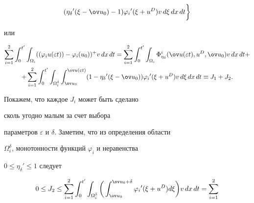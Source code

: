 \begin{pf}
\begin{multline*}
{({\eta_{\delta}}' (\xi-\ov u_{0})-1)


{\varphi_{i}}' (\xi+u^{D}) v\, d \xi\, d x\, d t} \bigg\}


\end{multline*}


или 


\begin{multline*} 


\sum_{i=1}^{2} 


\int_{0}^{{t}'} \int_{\Omega_{i}} (({\varphi_{i} u(\varepsilon t))-


\varphi_{i} (u_{0})} )^{+} v\, d x\, d t=


\sum_{i=1}^{2} \int_{0}^{{t}'} 


\int_{\Omega_{i}} \Phi_{\eta_{\delta}}^{i}


(\ov u (\varepsilon t), u^{D}, \ov u_{0}) v\, d x\, d t+\\


%


+\sum_{i=1}^{2} 


\int_{0}^{{t}'} \int_{\Omega_{i}^{\delta}}


\int_{\ov u_{0}}^{\ov u(\varepsilon t)} 


({1 -{\eta_{\delta}}' (\xi-\ov u_{0})} ) 


{\varphi_{i}}' (\xi+u^{D}) v\, d \xi\, d x\, dt \equiv J_{1}+J_{2}.


\end{multline*}





Покажем, что каждое $J_{i}$ может быть сделано 


сколь угодно малым за счет выбора


параметров $\varepsilon$ и $\delta$. Заметим, что из определения области


$\Omega_{i}^{\delta}$, монотонности функций $\varphi_{i}$ и неравенства


$0 \leq{\eta_{\delta}}' \leq 1$ следует


\begin{multline*}


0 \leq J_{2} \leq \sum_{i=1}^{2} 


\int_{0}^{{t}'} \int_{\Omega_{i}^{\delta}}\bigg(


\int_{\ov u_{0}}^{\ov u_{0}+\delta} 


{ \varphi_{i}}' (\xi+u^{D}) d \xi\bigg) v\, d x\, d t=


\sum_{i=1}^{2} 



\end{multline*}
\end{pf}

